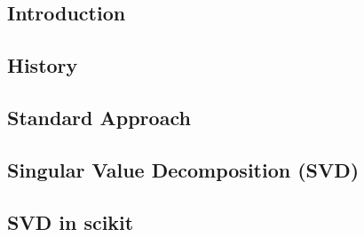 

\subsection{Introduction}


\clearpage




\subsection{History}

\clearpage




\subsection{Standard Approach} \label{section:standardApproach}

\clearpage




\subsection{Singular Value Decomposition (SVD)}

\clearpage



\subsection{SVD in scikit}

\clearpage
